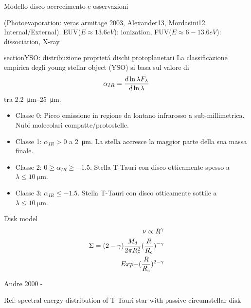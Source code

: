\begin{reworking}{Modello disco accrecimento e osservazioni}
	
	\begin{workout}
		(Photoevaporation: veras armitage 2003, Alexander13, Mordasini12. Internal/External).
		EUV($E\approx13.6eV$): ionization, FUV($E\approx6-13.6eV$): dissociation, X-ray
	\end{workout}
	
	\begin{workout}
		section{YSO: distribuzione propriet\'a dischi protoplanetari}
		La classificazione empirica degli young stellar object (YSO) si basa sul valore di
		\begin{equation}
		\alpha_{IR}=\frac{d \ln{\lambda F_{\lambda}}}{d \ln{\lambda}}
		\end{equation}
		tra \SIrange{2.2}{25}{\micro\meter}.
		\begin{itemize}
			\item Classe 0: Picco emissione in regione da lontano infrarosso a sub-millimetrica. Nubi molecolari compatte/protostelle.
			\item Classe 1: $\alpha_{IR}>0$ a \SI{2}{\micro\meter}. La stella accresce la maggior parte della sua massa finale.
			\item Classe 2: $0\geq\alpha_{IR}\geq-1.5$. Stella T-Tauri con disco otticamente spesso a $\lambda\leq\SI{10}{\micro\meter}$.
			\item Classe 3: $\alpha_{IR}\leq-1.5$. Stella T-Tauri con disco otticamente sottile a $\lambda\leq\SI{10}{\micro\meter}$.
		\end{itemize}
	\end{workout}
	
	\begin{workout}
		Disk model
		\begin{align}
		\nu\propto R^{\gamma}\\
		\Sigma=(2-\gamma)\frac{M_d}{2\pi R_c^2}(\frac{R}{R_c})^{-\gamma}\\Exp{-(\frac{R}{R_c})^{2-\gamma}}
		\end{align}
	\end{workout}
	
	
	\begin{workout}
		Andre 2000 - 
	\end{workout}
	
	\begin{workout}
		Ref: spectral energy distribution of T-Tauri star with passive circumstellar disk
	\end{workout}
	

\end{reworking}

